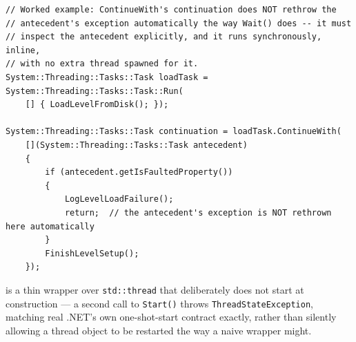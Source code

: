 \begin{lstlisting}
// Worked example: ContinueWith's continuation does NOT rethrow the
// antecedent's exception automatically the way Wait() does -- it must
// inspect the antecedent explicitly, and it runs synchronously, inline,
// with no extra thread spawned for it.
System::Threading::Tasks::Task loadTask = System::Threading::Tasks::Task::Run(
    [] { LoadLevelFromDisk(); });

System::Threading::Tasks::Task continuation = loadTask.ContinueWith(
    [](System::Threading::Tasks::Task antecedent)
    {
        if (antecedent.getIsFaultedProperty())
        {
            LogLevelLoadFailure();
            return;  // the antecedent's exception is NOT rethrown here automatically
        }
        FinishLevelSetup();
    });
\end{lstlisting}

 is a thin wrapper over \texttt{std::thread} that deliberately does
not start at construction --- a second call to \texttt{Start()} throws
\texttt{ThreadStateException}, matching real .NET's own one-shot-start contract exactly,
rather than silently allowing a thread object to be restarted the way a naive wrapper might.
